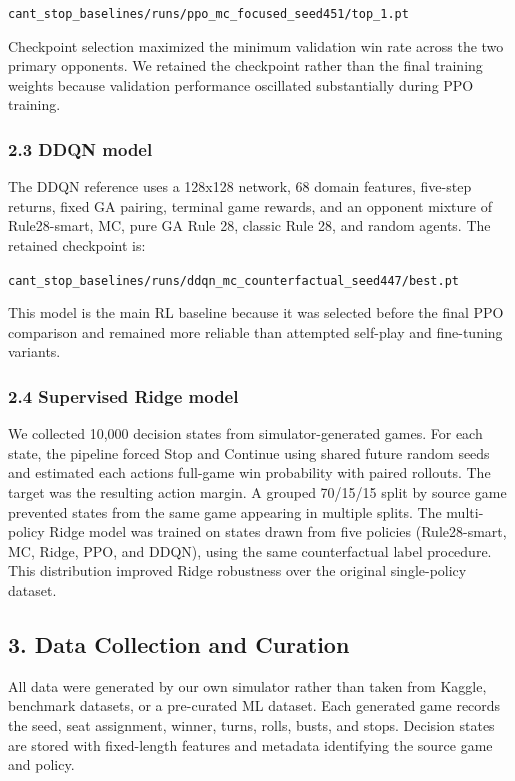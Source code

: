 \documentclass[
  11pt,
]{article}
\begin{document}
\texttt{cant\_stop\_baselines/runs/ppo\_mc\_focused\_seed451/top\_1.pt}

Checkpoint selection maximized the minimum validation win rate across
the two primary opponents. We retained the checkpoint rather than the
final training weights because validation performance oscillated
substantially during PPO training.

\subsubsection{2.3 DDQN model}\label{23-ddqn-model}

The DDQN reference uses a 128x128 network, 68 domain features, five-step
returns, fixed GA pairing, terminal game rewards, and an opponent
mixture of Rule28-smart, MC, pure GA Rule 28, classic Rule 28, and
random agents. The retained checkpoint is:

\texttt{cant\_stop\_baselines/runs/ddqn\_mc\_counterfactual\_seed447/best.pt}

This model is the main RL baseline because it was selected before the
final PPO comparison and remained more reliable than attempted self-play
and fine-tuning variants.

\subsubsection{2.4 Supervised Ridge
model}\label{24-supervised-ridge-model}

We collected 10,000 decision states from simulator-generated games. For
each state, the pipeline forced Stop and Continue using shared future
random seeds and estimated each action\textquotesingle s full-game win
probability with paired rollouts. The target was the resulting action
margin. A grouped 70/15/15 split by source game prevented states from
the same game appearing in multiple splits. The multi-policy Ridge model
was trained on states drawn from five policies (Rule28-smart, MC, Ridge,
PPO, and DDQN), using the same counterfactual label procedure. This
distribution improved Ridge robustness over the original single-policy
dataset.

\subsection{3. Data Collection and
Curation}\label{3-data-collection-and-curation}

All data were generated by our own simulator rather than taken from
Kaggle, benchmark datasets, or a pre-curated ML dataset. Each generated
game records the seed, seat assignment, winner, turns, rolls, busts, and
stops. Decision states are stored with fixed-length features and
metadata identifying the source game and policy.
\end{document}
